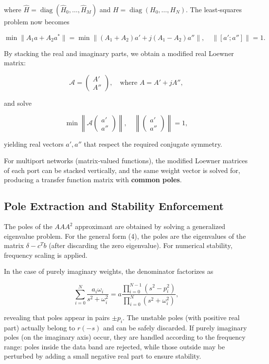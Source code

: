 \documentclass{article}
\begin{document}
where \(\hat{H} = \operatorname{diag}(\hat{H}_0,\dots,\hat{H}_M)\) and \(H = \operatorname{diag}(H_0,\dots,H_N)\). The least‑squares problem now becomes

\[
\min \| A_1 a + A_2 a^* \| = \min \| (A_1 + A_2) a' + j(A_1 - A_2) a'' \|,\quad \|[a'; a'']\| = 1. \tag{7}
\]

By stacking the real and imaginary parts, we obtain a modified real Loewner matrix:

\[
\mathcal{A} = \begin{pmatrix} A' \\ A'' \end{pmatrix},\quad \text{where } A = A' + jA'', \tag{8}
\]

and solve

\[
\min \left\| \mathcal{A} \begin{pmatrix} a' \\ a'' \end{pmatrix} \right\|,\quad \left\| \begin{pmatrix} a' \\ a'' \end{pmatrix} \right\| = 1,
\]

yielding real vectors \(a', a''\) that respect the required conjugate symmetry.

For multiport networks (matrix‑valued functions), the modified Loewner matrices of each port can be stacked vertically, and the same weight vector is solved for, producing a transfer function matrix with \textbf{common poles}.

\subsection{Pole Extraction and Stability Enforcement}

The poles of the $AAA^{2}$ approximant are obtained by solving a generalized eigenvalue problem. For the general form (4), the poles are the eigenvalues of the matrix \(\delta - c^T b\) (after discarding the zero eigenvalue). For numerical stability, frequency scaling is applied.

In the case of purely imaginary weights, the denominator factorizes as

\[
\sum_{i=0}^{N} \frac{a_i \omega_i}{s^2 + \omega_i^2} = a \frac{\prod_{i=0}^{N-1}(s^2 - p_i^2)}{\prod_{i=0}^{N}(s^2 + \omega_i^2)}, \tag{13}
\]

revealing that poles appear in pairs \(\pm p_i\). The unstable poles (with positive real part) actually belong to \(r(-s)\) and can be safely discarded. If purely imaginary poles (on the imaginary axis) occur, they are handled according to the frequency range: poles inside the data band are rejected, while those outside may be perturbed by adding a small negative real part to ensure stability.
\end{document}

